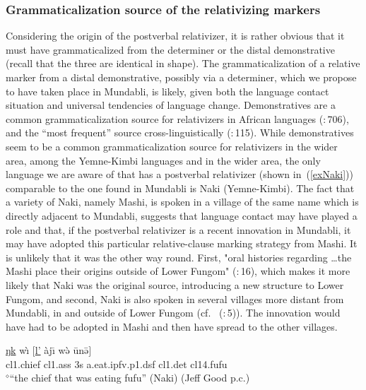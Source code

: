 \documentclass[10pt,twoside]{article}
\makeatletter
\newcommand{\cl}[1]{{\sc cl#1}}
\newcommand{\citepage}[2]{\citeauthor{#1}~{(\citeyear{#1}:\,{#2})}}
\newcommand{\citepp}[2]{(\citealp{#1}:\,{#2})}
\newcommand{\pref}[1]{(\ref{#1})}
\def\elicited{$^\diamond$}
\newcommand\MH{\texthighrise}
\renewcommand{\i}{ı}
\def\@{ə}
\def\ng{ŋ}
\makeatother
\begin{document}
\subsubsection{Grammaticalization source of the relativizing markers}\label{secMundabliGsource}
Considering the origin of the postverbal relativizer, it is rather obvious that it must have grammaticalized 
from the determiner or the distal demonstrative (recall that the three are identical in shape). The 
grammaticalization of a relative marker from a distal demonstrative, possibly via a determiner,
which we propose to have taken place in Mundabli, is likely, given both the language contact situation 
and universal tendencies of language change.
Demonstratives are a common grammaticalization source for relativizers in African 
languages \citepp{heine:2011}{706}, and the ``most frequent'' source cross-linguistically \citepp{heine:2002}{115}. 
While demonstratives seem to be a common grammaticalization source for relativizers in the wider area, among the 
Yemne-Kimbi languages and in the wider area, the only language we are aware of that has a postverbal relativizer (shown in~\pref{exNaki}) comparable to the one found in Mundabli is Naki (Yemne-Kimbi). The fact that a variety of Naki, 
namely Mashi, is spoken in a village of the same name which is directly adjacent to Mundabli, 
suggests that language contact may have played a role and that, if the postverbal relativizer is
a recent innovation in Mundabli, it may have adopted this particular relative-clause marking strategy from Mashi. 
It is unlikely that it was the other way round. First, "oral histories regarding \dots the Mashi place their origins outside of Lower Fungom" \citepp{ideologies}{16}, which makes it more likely that Naki was the original source, introducing a new structure to Lower Fungom, and second, Naki is also spoken in several villages more distant from Mundabli, in and outside of Lower Fungom (cf. \citepage{ideologies}{5}). The innovation would have had to be adopted in Mashi and then have spread to the other villages.
\begin{exe}
\ex \label{exNaki}
\gll \uline{{\ng}k\MH{u}{\ng}} w{\`\i} $[$\uline{l'} \`aj{\=\i} w{\`\@} \=un{\=\@}$]$	\\
\cl1.chief \cl1.{\sc ass} 3s a.eat.{\sc ipfv.p1.dsf} \cl1.{\sc det} \cl14.fufu	\\
\glt  \elicited ``the chief that was eating fufu'' (Naki) (Jeff Good p.c.)
\end{exe}
\end{document}
